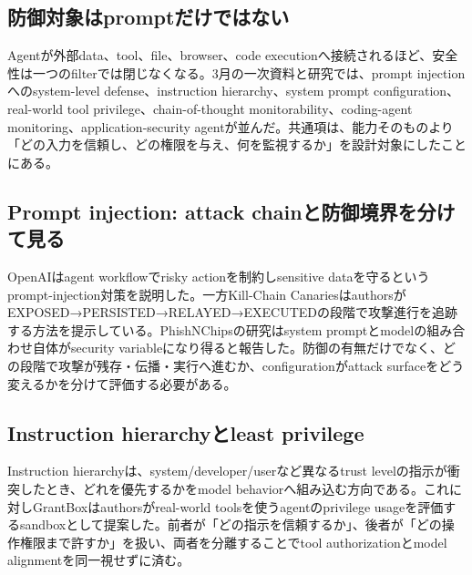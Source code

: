\begingroup\raggedright
\subsection{防御対象はpromptだけではない}
\par\endgroup

Agentが外部data、tool、file、browser、code executionへ接続されるほど、安全性は一つのfilterでは閉じなくなる。3月の一次資料と研究では、prompt injectionへのsystem-level defense、instruction hierarchy、system prompt configuration、real-world tool privilege、chain-of-thought monitorability、coding-agent monitoring、application-security agentが並んだ。共通項は、能力そのものより「どの入力を信頼し、どの権限を与え、何を監視するか」を設計対象にしたことにある。\autocite{src-18b7ee4fe5e4,src-287a6bf67154,src-3dec299964e6,src-549bffaad22c,src-5becf449a527,src-87dacccfecfd,src-b4b340379768,src-e627c8192172}


\begingroup\raggedright
\subsection{Prompt injection: attack chainと防御境界を分けて見る}
\par\endgroup

OpenAIはagent workflowでrisky actionを制約しsensitive dataを守るというprompt-injection対策を説明した。一方Kill-Chain CanariesはauthorsがEXPOSED→PERSISTED→RELAYED→EXECUTEDの段階で攻撃進行を追跡する方法を提示している。PhishNChipsの研究はsystem promptとmodelの組み合わせ自体がsecurity variableになり得ると報告した。防御の有無だけでなく、どの段階で攻撃が残存・伝播・実行へ進むか、configurationがattack surfaceをどう変えるかを分けて評価する必要がある。\autocite{src-3dec299964e6,src-87dacccfecfd,src-e627c8192172}


\begingroup\raggedright
\subsection{Instruction hierarchyとleast privilege}
\par\endgroup

\begingroup\raggedright
Instruction hierarchyは、system/developer/userなど異なるtrust levelの指示が衝突したとき、どれを優先するかをmodel behaviorへ組み込む方向である。これに対しGrantBoxはauthorsがreal-world toolsを使うagentのprivilege usageを評価するsandboxとして提案した。前者が「どの指示を信頼するか」、後者が「どの操作権限まで許すか」を扱い、両者を分離することでtool authorizationとmodel alignmentを同一視せずに済む。\autocite{src-18b7ee4fe5e4,src-549bffaad22c}
\par\endgroup



